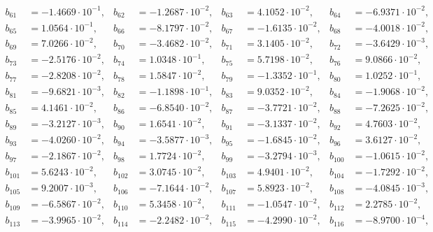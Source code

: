 \begin{align*}
b_{ 61 } &= -1.4669 \cdot 10^{ -1 }, & b_{ 62 } &= -1.2687 \cdot 10^{ -2 }, & b_{ 63 } &= 4.1052 \cdot 10^{ -2 }, & b_{ 64 } &= -6.9371 \cdot 10^{ -2 },\\ 
b_{ 65 } &= 1.0564 \cdot 10^{ -1 }, & b_{ 66 } &= -8.1797 \cdot 10^{ -2 }, & b_{ 67 } &= -1.6135 \cdot 10^{ -2 }, & b_{ 68 } &= -4.0018 \cdot 10^{ -2 },\\ 
b_{ 69 } &= 7.0266 \cdot 10^{ -2 }, & b_{ 70 } &= -3.4682 \cdot 10^{ -2 }, & b_{ 71 } &= 3.1405 \cdot 10^{ -2 }, & b_{ 72 } &= -3.6429 \cdot 10^{ -3 },\\ 
b_{ 73 } &= -2.5176 \cdot 10^{ -2 }, & b_{ 74 } &= 1.0348 \cdot 10^{ -1 }, & b_{ 75 } &= 5.7198 \cdot 10^{ -2 }, & b_{ 76 } &= 9.0866 \cdot 10^{ -2 },\\ 
b_{ 77 } &= -2.8208 \cdot 10^{ -2 }, & b_{ 78 } &= 1.5847 \cdot 10^{ -2 }, & b_{ 79 } &= -1.3352 \cdot 10^{ -1 }, & b_{ 80 } &= 1.0252 \cdot 10^{ -1 },\\ 
b_{ 81 } &= -9.6821 \cdot 10^{ -3 }, & b_{ 82 } &= -1.1898 \cdot 10^{ -1 }, & b_{ 83 } &= 9.0352 \cdot 10^{ -2 }, & b_{ 84 } &= -1.9068 \cdot 10^{ -2 },\\ 
b_{ 85 } &= 4.1461 \cdot 10^{ -2 }, & b_{ 86 } &= -6.8540 \cdot 10^{ -2 }, & b_{ 87 } &= -3.7721 \cdot 10^{ -2 }, & b_{ 88 } &= -7.2625 \cdot 10^{ -2 },\\ 
b_{ 89 } &= -3.2127 \cdot 10^{ -3 }, & b_{ 90 } &= 1.6541 \cdot 10^{ -2 }, & b_{ 91 } &= -3.1337 \cdot 10^{ -2 }, & b_{ 92 } &= 4.7603 \cdot 10^{ -2 },\\ 
b_{ 93 } &= -4.0260 \cdot 10^{ -2 }, & b_{ 94 } &= -3.5877 \cdot 10^{ -3 }, & b_{ 95 } &= -1.6845 \cdot 10^{ -2 }, & b_{ 96 } &= 3.6127 \cdot 10^{ -2 },\\ 
b_{ 97 } &= -2.1867 \cdot 10^{ -2 }, & b_{ 98 } &= 1.7724 \cdot 10^{ -2 }, & b_{ 99 } &= -3.2794 \cdot 10^{ -3 }, & b_{ 100 } &= -1.0615 \cdot 10^{ -2 },\\ 
b_{ 101 } &= 5.6243 \cdot 10^{ -2 }, & b_{ 102 } &= 3.0745 \cdot 10^{ -2 }, & b_{ 103 } &= 4.9401 \cdot 10^{ -2 }, & b_{ 104 } &= -1.7292 \cdot 10^{ -2 },\\ 
b_{ 105 } &= 9.2007 \cdot 10^{ -3 }, & b_{ 106 } &= -7.1644 \cdot 10^{ -2 }, & b_{ 107 } &= 5.8923 \cdot 10^{ -2 }, & b_{ 108 } &= -4.0845 \cdot 10^{ -3 },\\ 
b_{ 109 } &= -6.5867 \cdot 10^{ -2 }, & b_{ 110 } &= 5.3458 \cdot 10^{ -2 }, & b_{ 111 } &= -1.0547 \cdot 10^{ -2 }, & b_{ 112 } &= 2.2785 \cdot 10^{ -2 },\\ 
b_{ 113 } &= -3.9965 \cdot 10^{ -2 }, & b_{ 114 } &= -2.2482 \cdot 10^{ -2 }, & b_{ 115 } &= -4.2990 \cdot 10^{ -2 }, & b_{ 116 } &= -8.9700 \cdot 10^{ -4 },\\ 

\end{align*}
